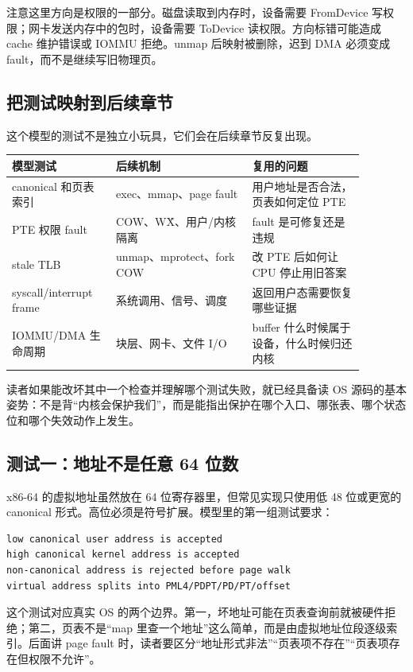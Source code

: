 注意这里方向是权限的一部分。磁盘读取到内存时，设备需要 FromDevice 写权限；网卡发送内存中的包时，设备需要 ToDevice 读权限。方向标错可能造成 cache 维护错误或 IOMMU 拒绝。unmap 后映射被删除，迟到 DMA 必须变成 fault，而不是继续写旧物理页。

\subsection{把测试映射到后续章节}

这个模型的测试不是独立小玩具，它们会在后续章节反复出现。

\begin{longtable}{p{0.26\linewidth}p{0.34\linewidth}p{0.28\linewidth}}
\toprule
模型测试 & 后续机制 & 复用的问题 \\
\midrule
canonical 和页表索引 & exec、mmap、page fault & 用户地址是否合法，页表如何定位 PTE \\
PTE 权限 fault & COW、W\^X、用户/内核隔离 & fault 是可修复还是违规 \\
stale TLB & unmap、mprotect、fork COW & 改 PTE 后如何让 CPU 停止用旧答案 \\
syscall/interrupt frame & 系统调用、信号、调度 & 返回用户态需要恢复哪些证据 \\
IOMMU/DMA 生命周期 & 块层、网卡、文件 I/O & buffer 什么时候属于设备，什么时候归还内核 \\
\bottomrule
\end{longtable}

读者如果能改坏其中一个检查并理解哪个测试失败，就已经具备读 OS 源码的基本姿势：不是背“内核会保护我们”，而是能指出保护在哪个入口、哪张表、哪个状态位和哪个失效动作上发生。

\subsection{测试一：地址不是任意 64 位数}

x86-64 的虚拟地址虽然放在 64 位寄存器里，但常见实现只使用低 48 位或更宽的 canonical 形式。高位必须是符号扩展。模型里的第一组测试要求：

\begin{lstlisting}
low canonical user address is accepted
high canonical kernel address is accepted
non-canonical address is rejected before page walk
virtual address splits into PML4/PDPT/PD/PT/offset
\end{lstlisting}

这个测试对应真实 OS 的两个边界。第一，坏地址可能在页表查询前就被硬件拒绝；第二，页表不是“map 里查一个地址”这么简单，而是由虚拟地址位段逐级索引。后面讲 page fault 时，读者要区分“地址形式非法”“页表项不存在”“页表项存在但权限不允许”。


